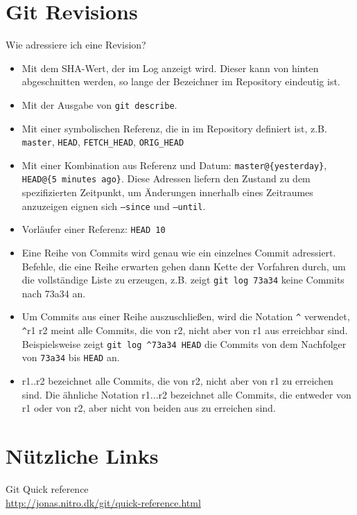 \documentclass[a4paper, 12pt]{article}
\begin{document}
\vfill

\section*{Git Revisions}

Wie adressiere ich eine Revision?

\begin{itemize}
\item Mit dem SHA-Wert, der im Log anzeigt wird. Dieser kann von hinten abgeschnitten werden, so lange der Bezeichner im Repository eindeutig ist.
\item Mit der Ausgabe von \texttt{git describe}.
\item Mit einer symbolischen Referenz, die in im Repository definiert ist, z.B. \texttt{master}, \texttt{HEAD}, \texttt{FETCH\_HEAD}, \texttt{ORIG\_HEAD}
\item Mit einer Kombination aus Referenz und Datum: \texttt{master@\{yesterday\}}, \texttt{HEAD@\{5 minutes ago\}}. Diese Adressen liefern den Zustand zu dem spezifizierten Zeitpunkt, um Änderungen innerhalb eines Zeitraumes anzuzeigen eignen sich \texttt{--since} und \texttt{--until}.
\item Vorläufer einer Referenz: \texttt{HEAD~10}
\item Eine Reihe von Commits wird genau wie ein einzelnes Commit adressiert. Befehle, die eine Reihe erwarten gehen dann Kette der Vorfahren durch, um die vollständige Liste zu erzeugen, z.B. zeigt \texttt{git log 73a34} keine Commits nach 73a34 an.
\item Um Commits aus einer Reihe auszuschließen, wird die Notation \verb|^| verwendet, \verb|^|r1 r2 meint alle Commits, die von r2, nicht aber von r1 aus erreichbar sind. Beispielsweise zeigt \texttt{git log }\verb|^|\texttt{73a34 HEAD} die Commits von dem Nachfolger von \texttt{73a34} bis \texttt{HEAD} an.
\item r1..r2 bezeichnet alle Commits, die von r2, nicht aber von r1 zu erreichen sind. Die ähnliche Notation r1...r2 bezeichnet alle Commits, die entweder von r1 oder von r2, aber nicht von beiden aus zu erreichen sind.
\end{itemize}

\vfill
\section*{Nützliche Links}

Git Quick reference\\
\url{http://jonas.nitro.dk/git/quick-reference.html}
\end{document}
